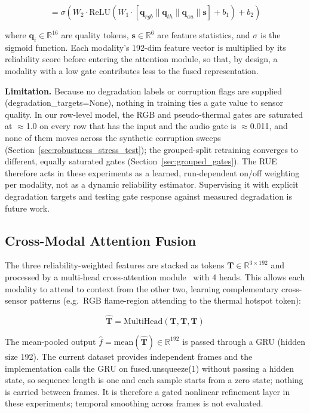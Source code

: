 \begin{equation}
    [r_{rgb}, r_{th}, r_{au}] = \sigma\!\left(W_2 \cdot \text{ReLU}(W_1 \cdot [\mathbf{q}_{rgb}\|\mathbf{q}_{th}\|\mathbf{q}_{au}\|\mathbf{s}] + b_1) + b_2\right)
\end{equation}

where $\mathbf{q}_i \in \mathbb{R}^{16}$ are quality tokens, $\mathbf{s} \in \mathbb{R}^6$ are feature statistics, and $\sigma$ is the sigmoid function. Each modality's 192-dim feature vector is multiplied by its reliability score before entering the attention module, so that, by design, a modality with a low gate contributes less to the fused representation.

\textbf{Limitation.} Because no degradation labels or corruption flags are supplied (degradation\_targets=None), nothing in training ties a gate value to sensor quality. In our row-level model, the RGB and pseudo-thermal gates are saturated at $\approx$1.0 on every row that has the input and the audio gate is $\approx$0.011, and none of them moves across the synthetic corruption sweeps (Section~\ref{sec:robustness_stress_test}); the grouped-split retraining converges to different, equally saturated gates (Section~\ref{sec:grouped_gates}). The RUE therefore acts in these experiments as a learned, run-dependent on/off weighting per modality, not as a dynamic reliability estimator. Supervising it with explicit degradation targets and testing gate response against measured degradation is future work.

\subsection{Cross-Modal Attention Fusion}

The three reliability-weighted features are stacked as tokens $\mathbf{T} \in \mathbb{R}^{3 \times 192}$ and processed by a multi-head cross-attention module~\cite{vaswani2017attention} with 4 heads. This allows each modality to attend to context from the other two, learning complementary cross-sensor patterns (e.g.\ RGB flame-region attending to the thermal hotspot token):

\begin{equation}
    \hat{\mathbf{T}} = \text{MultiHead}(\mathbf{T}, \mathbf{T}, \mathbf{T})
\end{equation}

The mean-pooled output $\hat{f} = \text{mean}(\hat{\mathbf{T}}) \in \mathbb{R}^{192}$ is passed through a GRU (hidden size 192). The current dataset provides independent frames and the implementation calls the GRU on fused.unsqueeze(1) without passing a hidden state, so sequence length is one and each sample starts from a zero state; nothing is carried between frames. It is therefore a gated nonlinear refinement layer in these experiments; temporal smoothing across frames is not evaluated.

